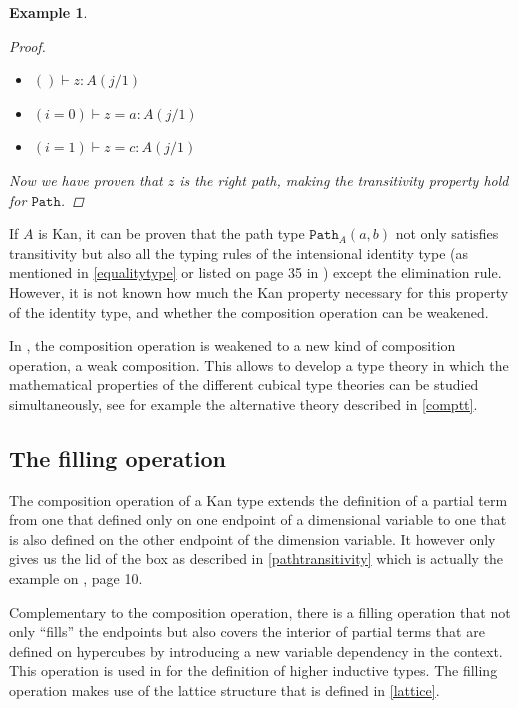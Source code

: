 \documentclass[12pt,a4paper,twoside,xetex,draft]{book}
\newtheorem{example}[theorem]{Example}
\newcommand{\op}[1]{\mathtt{#1}}
\begin{document}
\begin{example}
\begin{proof}
\begin{itemize}
\item $ () \vdash z: A(j/1)$
\item $ (i = 0) \vdash z = a : A(j/1)$
\item $ (i = 1) \vdash z = c : A(j/1)$
\end{itemize}

Now we have proven that $z$ is the right path, making the transitivity property hold for $\op{Path}$. 

\end{proof} 

\end{example}

If $A$ is Kan, it can be proven that the path type $\op{Path}_A(a,b)$ not only  satisfies transitivity but also all the typing rules of  the intensional identity type (as mentioned in \cref{equalitytype} or listed on page 35 in \cite{Orton2019}) except the elimination rule. However, it is not known how much the Kan property necessary for this property of the identity type, and whether the composition operation can be weakened. 

In \cite{Cavallo2019}, the composition operation is weakened to a new kind of composition operation, a weak composition. This allows to develop a type theory in which the mathematical properties of the different cubical type theories can be studied simultaneously, see for example the alternative theory described in \cref{comptt}.


\subsection{The filling operation}\label{filling}

The composition operation of a Kan type extends the definition of a partial term from one that defined only on one  endpoint  of a dimensional variable to one that is also defined on the other endpoint of the dimension variable. It however only gives us the lid of the box as described in \cref{pathtransitivity} which is actually the example  on \cite{Coquand2018}, page 10. 

Complementary to the composition operation, there is a filling operation that not only ``fills'' the endpoints but also covers the interior of partial terms that are defined on hypercubes by introducing a new variable dependency in the context. This operation is used in \cite{Coquand2018} for the definition of higher inductive types. The filling operation makes use of the lattice structure that is defined in \cref{lattice}. 
\end{document}
